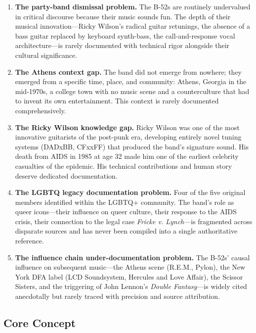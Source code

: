 \documentclass[11pt,letterpaper]{article}
\begin{document}
\begin{enumerate}
  \item \textbf{The party-band dismissal problem.} The B-52s are routinely undervalued in critical discourse because their music sounds fun. The depth of their musical innovation---Ricky Wilson's radical guitar retunings, the absence of a bass guitar replaced by keyboard synth-bass, the call-and-response vocal architecture---is rarely documented with technical rigor alongside their cultural significance.
  
  \item \textbf{The Athens context gap.} The band did not emerge from nowhere; they emerged from a specific time, place, and community: Athens, Georgia in the mid-1970s, a college town with no music scene and a counterculture that had to invent its own entertainment. This context is rarely documented comprehensively.
  
  \item \textbf{The Ricky Wilson knowledge gap.} Ricky Wilson was one of the most innovative guitarists of the post-punk era, developing entirely novel tuning systems (DADxBB, CFxxFF) that produced the band's signature sound. His death from AIDS in 1985 at age 32 made him one of the earliest celebrity casualties of the epidemic. His technical contributions and human story deserve dedicated documentation.
  
  \item \textbf{The LGBTQ legacy documentation problem.} Four of the five original members identified within the LGBTQ+ community. The band's role as queer icons---their influence on queer culture, their response to the AIDS crisis, their connection to the legal case \textit{Fricke v. Lynch}---is fragmented across disparate sources and has never been compiled into a single authoritative reference.
  
  \item \textbf{The influence chain under-documentation problem.} The B-52s' causal influence on subsequent music---the Athens scene (R.E.M., Pylon), the New York DFA label (LCD Soundsystem, Hercules and Love Affair), the Scissor Sisters, and the triggering of John Lennon's \textit{Double Fantasy}---is widely cited anecdotally but rarely traced with precision and source attribution.
\end{enumerate}

\subsection{Core Concept}
\end{document}
